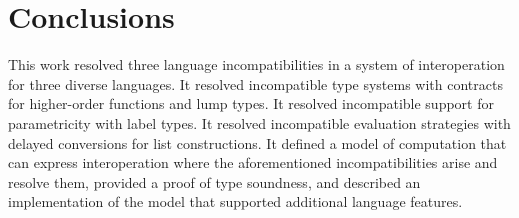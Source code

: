 \chapter{Conclusions}

This work resolved three language incompatibilities in a system of interoperation for three diverse languages.  It resolved incompatible type systems with contracts for higher-order functions and lump types.  It resolved incompatible support for parametricity with label types.  It resolved incompatible evaluation strategies with delayed conversions for list constructions.  It defined a model of computation that can express interoperation where the aforementioned incompatibilities arise and resolve them, provided a proof of type soundness, and described an implementation of the model that supported additional language features.
